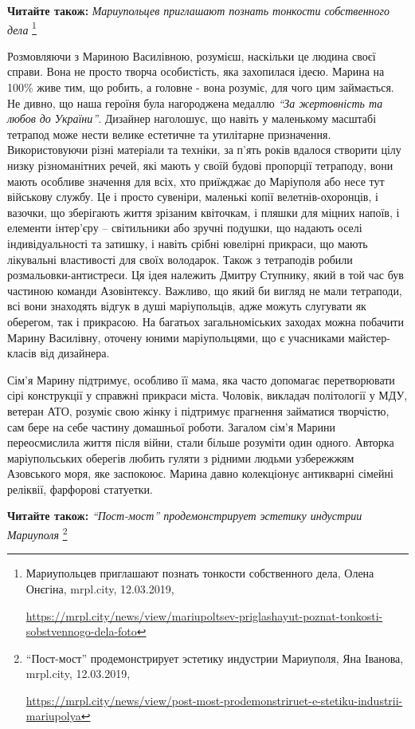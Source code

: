 \textbf{Читайте також:} \emph{Мариупольцев приглашают познать тонкости собственного дела}%
\footnote{Мариупольцев приглашают познать тонкости собственного дела, Олена Онєгіна, mrpl.city, 12.03.2019, \par%
\url{https://mrpl.city/news/view/mariupoltsev-priglashayut-poznat-tonkosti-sobstvennogo-dela-foto}
}


Розмовляючи з Мариною Василівною, розумієш, наскільки це людина своєї справи.
Вона не просто творча особистість, яка захопилася ідеєю. Марина на 100\% живе
тим, що робить, а головне - вона розуміє, для чого цим займається. Не дивно, що
наша героїня була нагороджена медаллю \emph{\enquote{За жертовність та любов до України}}.
Дизайнер наголошує, що навіть у маленькому масштабі тетрапод може нести велике
естетичне та утилітарне призначення. Використовуючи різні матеріали та техніки,
за п'ять років вдалося створити цілу низку різноманітних речей, які мають у
своїй будові пропорції тетраподу, вони мають особливе значення для всіх, хто
приїжджає до Маріуполя або несе тут військову службу. Це і просто сувеніри,
маленькі копії велетнів-охоронців, і вазочки, що зберігають життя зрізаним
квіточкам, і пляшки для міцних напоїв, і елементи інтер'єру – світильники або
зручні подушки, що надають оселі індивідуальності та затишку, і навіть срібні
ювелірні прикраси, що мають лікувальні властивості для своїх володарок. Також з
тетраподів робили розмальовки-антистреси. Ця ідея належить Дмитру Ступнику,
який в той час був частиною команди Азовінтексу. Важливо, що який би вигляд не
мали тетраподи, всі вони знаходять відгук в душі маріупольців, адже можуть
слугувати як оберегом, так і прикрасою. На багатьох загальноміських заходах
можна побачити Марину Василівну, оточену юними маріупольцями, що є учасниками
майстер-класів від дизайнера.

Сім'я Марину підтримує, особливо її мама, яка часто допомагає перетворювати
сірі конструкції у справжні прикраси міста. Чоловік, викладач політології у
МДУ, ветеран АТО, розуміє свою жінку і підтримує прагнення займатися творчістю,
сам бере на себе частину домашньої роботи. Загалом сім'я Марини переосмислила
життя після війни, стали більше розуміти один одного. Авторка маріупольських
оберегів любить гуляти з рідними людьми узбережжям Азовського моря, яке
заспокоює. Марина давно колекціонує антикварні сімейні реліквії, фарфорові
статуетки.

\textbf{Читайте також:} \emph{\enquote{Пост-мост} продемонстрирует эстетику индустрии Мариуполя}%
\footnote{\enquote{Пост-мост} продемонстрирует эстетику индустрии Мариуполя, Яна Іванова, mrpl.city, 12.03.2019, \par%
\url{https://mrpl.city/news/view/post-most-prodemonstriruet-e-stetiku-industrii-mariupolya}
}

